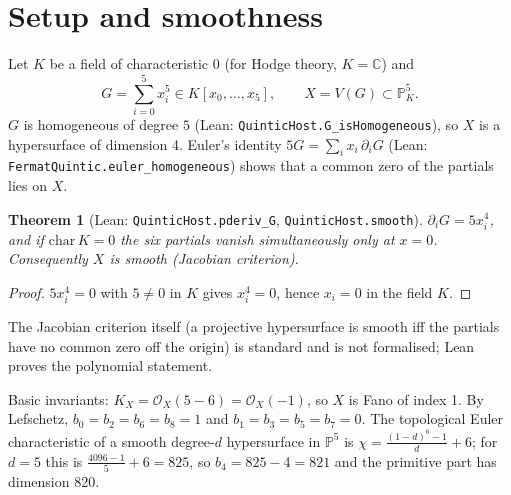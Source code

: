 \documentclass[11pt]{article}
\newtheorem{theorem}{Theorem}[section]\newtheorem{proposition}[theorem]{Proposition}
\theoremstyle{definition}\newtheorem{definition}[theorem]{Definition}\newtheorem{remark}[theorem]{Remark}
\newcommand{\PP}{\mathbb{P}}\newcommand{\CC}{\mathbb{C}}\newcommand{\QQ}{\mathbb{Q}}
\begin{document}
\section{Setup and smoothness}\label{sec:setup}
Let $K$ be a field of characteristic $0$ (for Hodge theory, $K=\CC$) and
\[ G=\sum_{i=0}^5 x_i^5\in K[x_0,\dots,x_5],\qquad X=V(G)\subset\PP^5_K. \]
$G$ is homogeneous of degree $5$ (Lean: \texttt{QuinticHost.G\_isHomogeneous}), so $X$ is a hypersurface
of dimension 4. Euler's identity $5G=\sum_i x_i\,\partial_iG$ (Lean: \texttt{FermatQuintic.euler\_homogeneous})
shows that a common zero of the partials lies on $X$.

\begin{theorem}[Lean: \texttt{QuinticHost.pderiv\_G}, \texttt{QuinticHost.smooth}]
$\partial_iG=5x_i^4$, and if $\mathrm{char}\,K=0$ the six partials vanish simultaneously only at $x=0$.
Consequently $X$ is smooth (Jacobian criterion).
\end{theorem}
\begin{proof}
$5x_i^4=0$ with $5\neq0$ in $K$ gives $x_i^4=0$, hence $x_i=0$ in the field $K$.
\end{proof}
The Jacobian criterion itself (a projective hypersurface is smooth iff the partials have no common zero
off the origin) is standard and is not formalised; Lean proves the polynomial statement.

Basic invariants: $K_X=\mathcal O_X(5-6)=\mathcal O_X(-1)$, so $X$ is Fano of index 1. By Lefschetz,
$b_0=b_2=b_6=b_8=1$ and $b_1=b_3=b_5=b_7=0$. The topological Euler characteristic of a smooth degree-$d$
hypersurface in $\PP^5$ is $\chi=\frac{(1-d)^6-1}{d}+6$; for $d=5$ this is $\frac{4096-1}{5}+6=825$,
so $b_4=825-4=821$ and the primitive part has dimension $820$.
\end{document}
